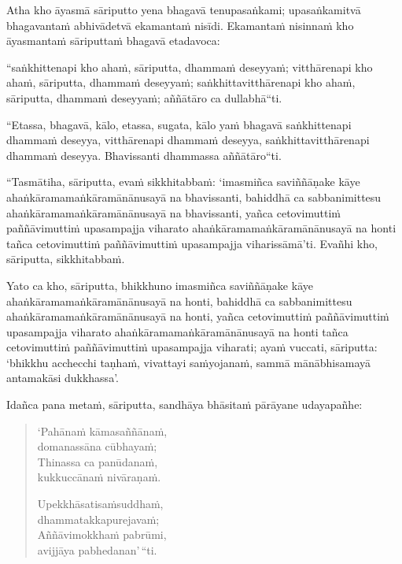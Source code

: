 \clearpage

Atha kho āyasmā sāriputto yena bhagavā tenupasaṅkami; upasaṅkamitvā bhagavantaṁ abhivādetvā ekamantaṁ nisīdi. Ekamantaṁ nisinnaṁ kho āyasmantaṁ sāriputtaṁ bhagavā etadavoca:

``saṅkhittenapi kho ahaṁ, sāriputta, dhammaṁ deseyyaṁ; vitthārenapi kho ahaṁ, sāriputta, dhammaṁ deseyyaṁ; saṅkhittavitthārenapi kho ahaṁ, sāriputta, dhammaṁ deseyyaṁ; aññātāro ca dullabhā``ti.

``Etassa, bhagavā, kālo, etassa, sugata, kālo yaṁ bhagavā saṅkhittenapi dhammaṁ deseyya, vitthārenapi dhammaṁ deseyya, saṅkhittavitthārenapi dhammaṁ deseyya. Bhavissanti dhammassa aññātāro``ti.

``Tasmātiha, sāriputta, evaṁ sikkhitabbaṁ: `imasmiñca saviññāṇake kāye ahaṅkāramamaṅkāramānānusayā na bhavissanti, bahiddhā ca sabbanimittesu ahaṅkāramamaṅkāramānānusayā na bhavissanti, yañca cetovimuttiṁ paññāvimuttiṁ upasampajja viharato ahaṅkāramamaṅkāramānānusayā na honti tañca cetovimuttiṁ paññāvimuttiṁ upasampajja viharissāmā'ti. Evañhi kho, sāriputta, sikkhitabbaṁ.

Yato ca kho, sāriputta, bhikkhuno imasmiñca saviññāṇake kāye ahaṅkāramamaṅkāramānānusayā na honti, bahiddhā ca sabbanimittesu ahaṅkāramamaṅkāramānānusayā na honti, yañca cetovimuttiṁ paññāvimuttiṁ upasampajja viharato ahaṅkāramamaṅkāramānānusayā na honti tañca cetovimuttiṁ paññāvimuttiṁ upasampajja viharati; ayaṁ vuccati, sāriputta: `bhikkhu acchecchi taṇhaṁ, vivattayi saṁyojanaṁ, sammā mānābhisamayā antamakāsi dukkhassa'.

Idañca pana metaṁ, sāriputta, sandhāya bhāsitaṁ pārāyane udayapañhe:

\begin{quote}
`Pahānaṁ kāmasaññānaṁ,\\
domanassāna cūbhayaṁ;\\
Thinassa ca panūdanaṁ,\\
kukkuccānaṁ nivāraṇaṁ.

Upekkhāsatisaṁsuddhaṁ,\\
dhammatakkapurejavaṁ;\\
Aññāvimokkhaṁ pabrūmi,\\
avijjāya pabhedanan'\,``ti.
\end{quote}
